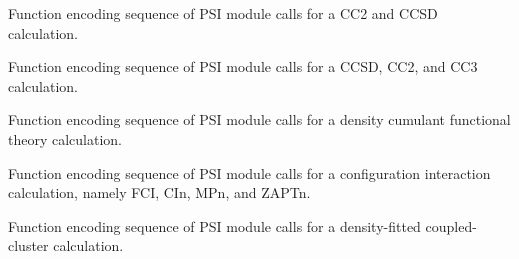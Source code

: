\documentclass[letterpaper,10pt,english]{sphinxmanual}
\begin{document}

\begin{fulllineitems}
\label{index:proc.run_cc_response}
Function encoding sequence of PSI module calls for
a CC2 and CCSD calculation.

\end{fulllineitems}


\begin{fulllineitems}
\label{index:proc.run_ccenergy}
Function encoding sequence of PSI module calls for
a CCSD, CC2, and CC3 calculation.

\end{fulllineitems}


\begin{fulllineitems}
\label{index:proc.run_dcft}
Function encoding sequence of PSI module calls for
a density cumulant functional theory calculation.

\end{fulllineitems}


\begin{fulllineitems}
\label{index:proc.run_detci}
Function encoding sequence of PSI module calls for
a configuration interaction calculation, namely FCI,
CIn, MPn, and ZAPTn.

\end{fulllineitems}


\begin{fulllineitems}
\label{index:proc.run_dfcc}
Function encoding sequence of PSI module calls for
a density-fitted coupled-cluster calculation.

\end{fulllineitems}

\end{document}
